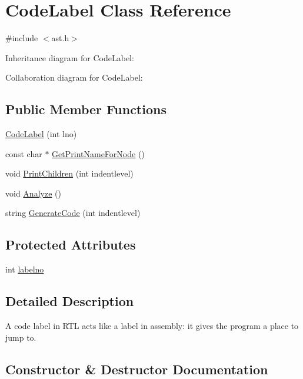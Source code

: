 \hypertarget{class_code_label}{}\section{Code\+Label Class Reference}
\label{class_code_label}


{\ttfamily \#include $<$ast.\+h$>$}



Inheritance diagram for Code\+Label\+:


Collaboration diagram for Code\+Label\+:
\subsection*{Public Member Functions}
\begin{DoxyCompactItemize}
\item 
\hyperlink{class_code_label_a62f32ceb3260da49e06e44432d58b8b1}{Code\+Label} (int lno)
\item 
const char $\ast$ \hyperlink{class_code_label_a8facbf3c0c9e138c5e20c82638b5f78b}{Get\+Print\+Name\+For\+Node} ()
\item 
void \hyperlink{class_code_label_a982af1b687ea06a189a87f49a50fdf93}{Print\+Children} (int indentlevel)
\item 
void \hyperlink{class_code_label_a7318d2169f33b5296d9f98e17213f634}{Analyze} ()
\item 
string \hyperlink{class_code_label_a2e6b55e59cbf6213ed5b3e9fc9d8181c}{Generate\+Code} (int indentlevel)
\end{DoxyCompactItemize}
\subsection*{Protected Attributes}
\begin{DoxyCompactItemize}
\item 
int \hyperlink{class_code_label_a6dd4c69e6bc1c0b479d2bea79b0aa568}{labelno}
\end{DoxyCompactItemize}


\subsection{Detailed Description}
A code label in R\+TL acts like a label in assembly\+: it gives the program a place to jump to. 

\subsection{Constructor \& Destructor Documentation}
\mbox{\label{class_code_label_a62f32ceb3260da49e06e44432d58b8b1}} 
